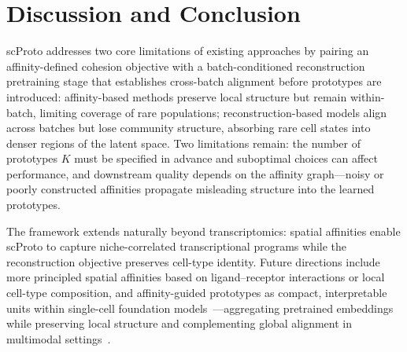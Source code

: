 \section{Discussion and Conclusion}

scProto addresses two core limitations of existing approaches by pairing an affinity-defined cohesion objective with a batch-conditioned reconstruction pretraining stage that establishes cross-batch alignment before prototypes are introduced: affinity-based methods preserve local structure but remain within-batch, limiting coverage of rare populations; reconstruction-based models align across batches but lose community structure, absorbing rare cell states into denser regions of the latent space. Two limitations remain: the number of prototypes $K$ must be specified in advance and suboptimal choices can affect performance, and downstream quality depends on the affinity graph---noisy or poorly constructed affinities propagate misleading structure into the learned prototypes.

The framework extends naturally beyond transcriptomics: spatial affinities enable scProto to capture niche-correlated transcriptional programs while the reconstruction objective preserves cell-type identity. Future directions include more principled spatial affinities based on ligand--receptor interactions or local cell-type composition, and affinity-guided prototypes as compact, interpretable units within single-cell foundation models~\citep{szalata2024transformers,richter2025delineating,bahrami2025scconcept}---aggregating pretrained embeddings while preserving local structure and complementing global alignment in multimodal settings~\citep{richter2026beyond,bahrami2026modality}.
